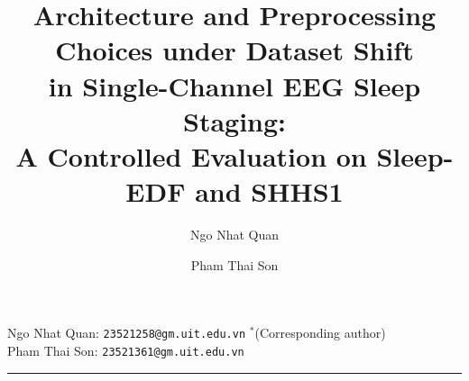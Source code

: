 \documentclass[11pt,a4paper]{article}
\begin{document}
\title{\bfseries\LARGE Architecture and Preprocessing Choices under Dataset Shift\\[0.15em]
in Single-Channel EEG Sleep Staging:\\[0.15em]
A Controlled Evaluation on Sleep-EDF and SHHS1}

\author[1,$\ast$]{Ngo Nhat Quan}
\author[1]{Pham Thai Son}

\date{}

\maketitle
\thispagestyle{empty}

\vspace{-1.0em}
\begin{center}
\small
Ngo Nhat Quan: \texttt{23521258@gm.uit.edu.vn} $^{\ast}$(Corresponding author) \\[0.2em]
Pham Thai Son: \texttt{23521361@gm.uit.edu.vn}
\end{center}

\vspace{0.4em}
\begin{center}\rule{0.9\textwidth}{0.4pt}\end{center}
\vspace{-0.2em}
\end{document}
